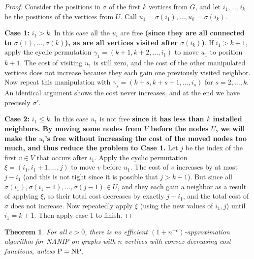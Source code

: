\documentclass[english]{llncs}
\newtheorem{thm}{Theorem}
\newcommand{\chg}[1]{\textbf{\color{red} #1}}
\begin{document}
\begin{proof}
Consider the positions in $\sigma$ of the first $k$ vertices from $G$, and let
$i_1, \dots, i_k$ be the positions of the vertices from $U$. Call $u_1 =
\sigma(i_1), \dots, u_k = \sigma(i_k)$.

\textbf{Case 1:} $i_1 > k$. In this case all the $u_i$ are free
\chg{(since they are all connected to $\sigma(1),\ldots,\sigma(k)$), as are all
vertices visited after $\sigma(i_k)$)}.
If $i_1 > k+1$, apply the cyclic permutation
$\gamma_1 = (k+1, k+2, \dots, i_1)$ to move $u_1$ to position $k+1$. The cost
of visiting $u_1$ is still zero, and the cost of the other manipulated vertices
does not increase because they each gain one previously visited neighbor. Now
repeat this manipulation with $\gamma_s = (k+s, k+s+1, \dots, i_s)$ for $s = 2,
\dots, k$. An identical argument shows the cost never increases, and at the end
we have precisely $\sigma'$. 

\textbf{Case 2:} $i_1 \leq k$. In this case $u_1$ is not free \chg{since it has less
than $k$ installed neighbors.
By moving some nodes from $V$ before the nodes $U$, we will make the $u_i$'s free
without increasing the cost of the moved nodes too much,
and thus reduce the problem to Case 1.}
Let $j$ be the
index of the first $v \in V$ that occurs after $i_1$. Apply the
cyclic permutation $\xi = (i_1, i_1 + 1, \dots, j)$ to move $v$ before $u_1$.
The cost of $v$ increases by at most $j - i_1$ (and this is not tight since it
is possible that $j > k+1$). But since all $\sigma(i_1), \sigma(i_1 + 1), \dots,
\sigma(j-1) \in U$, and they each gain a neighbor as a result of applying
$\xi$, so their total cost decreases by exactly $j - i_1$, and the total cost
of $\sigma$ does not increase. Now repeatedly apply $\xi$ (using the new values
of $i_1, j$) until $i_1 = k+1$. Then apply case 1 to finish.
\end{proof}


\begin{thm}
For all $c>0$, there is no efficient $(1+n^{-c})$-approximation
algorithm for NANIP on graphs with $n$ vertices with convex decreasing cost
functions, unless $\textup{P} = \textup{NP}$.  
\end{thm}
\end{document}
